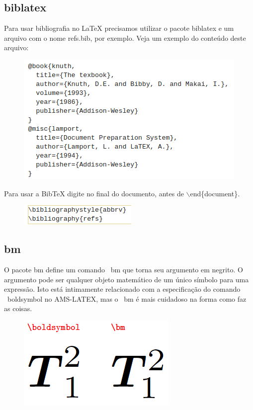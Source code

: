 \documentclass[12pt]{article}
\begin{document}
		\subsection{biblatex}
			Para usar bibliografia no LaTeX precisamos utilizar o pacote biblatex e um arquivo com o nome refs.bib, por exemplo. Veja um exemplo do conteúdo deste arquivo:\\
			\begin{figure}[h]
				\centering
				\includegraphics[scale=0.5]{2i.png}
			\end{figure}
			\newpage
			Para usar a BibTeX digite no final do documento, antes de $\backslash$end\{{document}\}.
			\begin{figure}[h]
				\centering
				\includegraphics[scale=0.8]{3i.png}
			\end{figure}
		
		
		\subsection{bm}
			O pacote bm define um comando \ bm que torna seu argumento em negrito. O argumento pode ser qualquer objeto matemático de um único símbolo para uma expressão. Isto está intimamente relacionado com a especificação do comando \ boldsymbol no AMS-LATEX, mas o \ bm é mais cuidadoso na forma como faz as coisas.
			\begin{figure}[h]
				\centering
				\includegraphics[scale=0.6]{6i.png}
			\end{figure}
		
\end{document}
